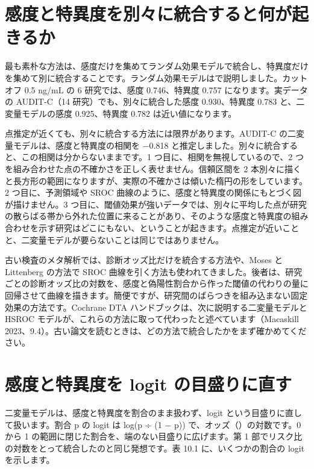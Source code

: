 \section{感度と特異度を別々に統合すると何が起きるか}
\label{sec:10-2}

最も素朴な方法は、感度だけを集めてランダム効果モデルで統合し、特異度だけを集めて別に統合することです。ランダム効果モデルはで説明しました。カットオフ 0.5 ng/mL の 6 研究では、感度 0.746、特異度 0.757 になります。実データの AUDIT-C（14 研究）でも、別々に統合した感度 0.930、特異度 0.783 と、二変量モデルの感度 0.925、特異度 0.782 は近い値になります。

点推定が近くても、別々に統合する方法には限界があります。AUDIT-C の二変量モデルは、感度と特異度の相関を −0.818 と推定しました。別々に統合すると、この相関は分からないままです。1 つ目に、相関を無視しているので、2 つを組み合わせた点の不確かさを正しく表せません。信頼区間を 2 本別々に描くと長方形の範囲になりますが、実際の不確かさは傾いた楕円の形をしています。2 つ目に、予測領域や SROC 曲線のように、感度と特異度の関係にもとづく図が描けません。3 つ目に、閾値効果が強いデータでは、別々に平均した点が研究の散らばる帯から外れた位置に来ることがあり、そのような感度と特異度の組み合わせを示す研究はどこにもない、ということが起きます。点推定が近いことと、二変量モデルが要らないことは同じではありません。

\begin{hattenbox}
古い検査のメタ解析では、診断オッズ比だけを統合する方法や、Moses と Littenberg の方法で SROC 曲線を引く方法も使われてきました。後者は、研究ごとの診断オッズ比の対数を、感度と偽陽性割合から作った閾値の代わりの量に回帰させて曲線を描きます。簡便ですが、研究間のばらつきを組み込まない固定効果の方法です。Cochrane DTA ハンドブックは、次に説明する二変量モデルと HSROC モデルが、これらの方法に取って代わったと述べています（Macaskill 2023、9.4）。古い論文を読むときは、どの方法で統合したかをまず確かめてください。
\end{hattenbox}

\section{感度と特異度を logit の目盛りに直す}
\label{sec:10-3}

二変量モデルは、感度と特異度を割合のまま扱わず、logit という目盛りに直して扱います。割合 p の logit は log(p ÷ (1 − p)) で、オッズ（）の対数です。0 から 1 の範囲に閉じた割合を、端のない目盛りに広げます。第 1 部でリスク比の対数をとって統合したのと同じ発想です。表 10.1 に、いくつかの割合の logit を示します。

